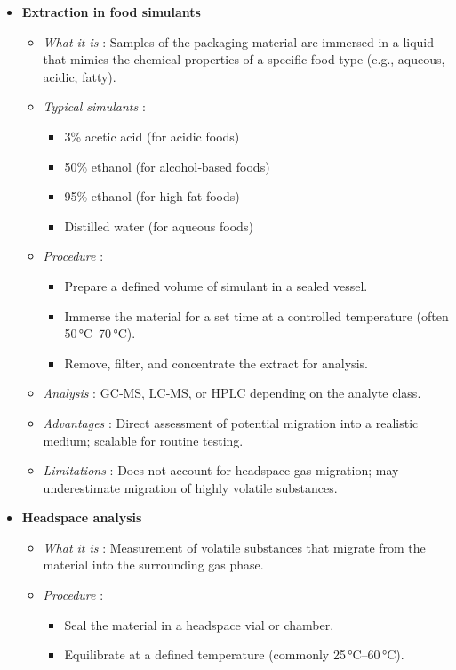 \documentclass[11pt,a4paper]{article}
\begin{document}
\begin{itemize}
\item 
\textbf{Extraction in food simulants}
  \begin{itemize}
\item \textit{What it is} : Samples of the packaging material are immersed in a liquid that mimics the chemical properties of a specific food type (e.g., aqueous, acidic, fatty).
\item 
\textit{Typical simulants} :
    \begin{itemize}
\item 3\% acetic acid (for acidic foods)
\item 50\% ethanol (for alcohol‑based foods)
\item 95\% ethanol (for high‑fat foods)
\item Distilled water (for aqueous foods)
    \end{itemize}
\item 
\textit{Procedure} :
    \begin{itemize}
\item Prepare a defined volume of simulant in a sealed vessel.
\item Immerse the material for a set time at a controlled temperature (often 50 °C–70 °C).
\item Remove, filter, and concentrate the extract for analysis.
    \end{itemize}
\item \textit{Analysis} : GC‑MS, LC‑MS, or HPLC depending on the analyte class.
\item \textit{Advantages} : Direct assessment of potential migration into a realistic medium; scalable for routine testing.
\item \textit{Limitations} : Does not account for headspace gas migration; may underestimate migration of highly volatile substances.
  \end{itemize}
\item 
\textbf{Headspace analysis}
  \begin{itemize}
\item \textit{What it is} : Measurement of volatile substances that migrate from the material into the surrounding gas phase.
\item 
\textit{Procedure} :
    \begin{itemize}
\item Seal the material in a headspace vial or chamber.
\item Equilibrate at a defined temperature (commonly 25 °C–60 °C).

\end{itemize}
\end{itemize}
\end{itemize}
\end{document}
